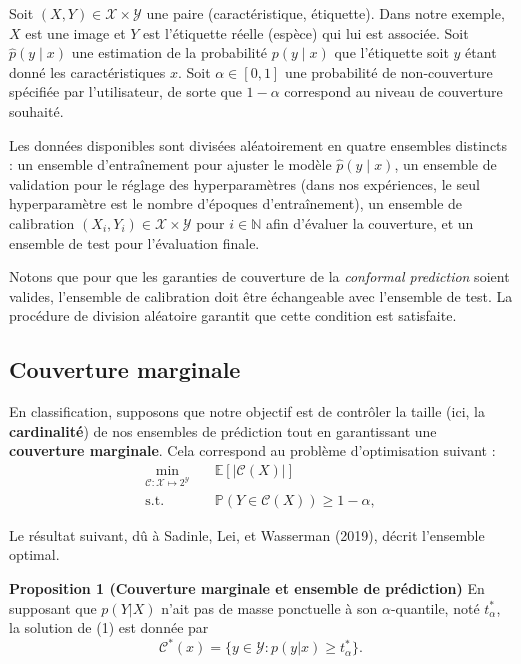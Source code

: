 \documentclass[12pt,a4paper]{article}
\begin{document}
Soit $(X, Y) \in \mathcal{X} \times \mathcal{Y}$ une paire (caractéristique, étiquette). Dans notre exemple, $X$ est une image et $Y$ est l’étiquette réelle (espèce) qui lui est associée. Soit $\hat{p}(y \mid x)$ une estimation de la probabilité $p(y \mid x)$ que l’étiquette soit $y$ étant donné les caractéristiques $x$. Soit $\alpha \in [0,1]$ une probabilité de non-couverture spécifiée par l’utilisateur, de sorte que $1 - \alpha$ correspond au niveau de couverture souhaité.

Les données disponibles sont divisées aléatoirement en quatre ensembles distincts : un ensemble d’entraînement pour ajuster le modèle $\hat{p}(y \mid x)$, un ensemble de validation pour le réglage des hyperparamètres (dans nos expériences, le seul hyperparamètre est le nombre d’époques d’entraînement), un ensemble de calibration $(X_i, Y_i) \in \mathcal{X} \times \mathcal{Y}$ pour $i \in \mathbb{N}$ afin d’évaluer la couverture, et un ensemble de test pour l’évaluation finale. 

Notons que pour que les garanties de couverture de la \textit{conformal prediction} soient valides, l’ensemble de calibration doit être échangeable avec l’ensemble de test. La procédure de division aléatoire garantit que cette condition est satisfaite.





\subsection{Couverture marginale}

En classification, supposons que notre objectif est de contrôler la taille (ici, la \textbf{cardinalité}) de nos ensembles de prédiction tout en garantissant une \textbf{couverture marginale}. Cela correspond au problème d'optimisation suivant :
\begin{equation}
    \begin{aligned}
        \min_{\mathcal{C}: \mathcal{X} \mapsto 2^{\mathcal{Y}}} \quad & \mathbb{E}[|\mathcal{C}(X)|] \\
        \text{s.t.} \quad & \mathbb{P}(Y \in \mathcal{C}(X)) \geq 1 - \alpha,
    \end{aligned}
\end{equation}

Le résultat suivant, dû à Sadinle, Lei, et Wasserman (2019), décrit l'ensemble optimal.

\begin{tcolorbox}[
      enhanced,
    colback=propbg,
    colframe=propbg,
    boxrule=0pt,
    leftrule=4pt,
    borderline west={4pt}{0pt}{propborder},
    arc=2pt,
    left=2mm, right=2mm, top=2mm, bottom=2mm
]
\textbf{Proposition 1 (Couverture marginale et ensemble de prédiction)} En supposant que $p(Y|X)$ n'ait pas de masse ponctuelle à son $\alpha$-quantile, noté $t_{\alpha}^*$, la solution de ({\color{linkorange}1}) est donnée par
\[
\mathcal{C}^*(x) = \{y \in \mathcal{Y} : p(y|x) \ge t_{\alpha}^*\}.
\]
\end{tcolorbox}
\end{document}
